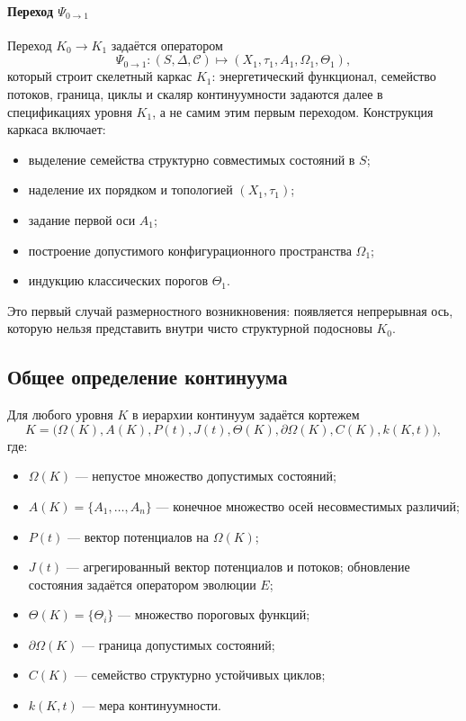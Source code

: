 \paragraph{Переход \texorpdfstring{$\Psi_{0\to 1}$}{Psi\_0\_to\_1}}
Переход \(K_0 \to K_1\) задаётся оператором
\[
    \Psi_{0\to 1} : (S,\Delta,\mathcal{C}) \mapsto (X_1,\tau_1,A_1,\Omega_1,\Theta_1),
\]
который строит скелетный каркас \(K_1\): энергетический функционал,
семейство потоков, граница, циклы и скаляр континуумности задаются далее в
спецификациях уровня \(K_1\), а не самим этим первым переходом.
Конструкция каркаса включает:
\begin{itemize}
    \item выделение семейства структурно совместимых состояний в \(S\);
    \item наделение их порядком и топологией \((X_1,\tau_1)\);
    \item задание первой оси \(A_1\);
    \item построение допустимого конфигурационного пространства \(\Omega_1\);
    \item индукцию классических порогов \(\Theta_1\).
\end{itemize}
Это первый случай размерностного возникновения: появляется непрерывная ось, которую нельзя
представить внутри чисто структурной подосновы \(K_0\).

\subsection{Общее определение континуума}

Для любого уровня \(K\) в иерархии континуум задаётся кортежем
\[
    K = \big(\Omega(K), A(K), P(t), J(t), \Theta(K), \partial\Omega(K), C(K), k(K,t)\big),
\]
где:
\begin{itemize}
    \item \(\Omega(K)\) — непустое множество допустимых состояний;
    \item \(A(K) = \{A_1,\dots,A_n\}\) — конечное множество осей несовместимых различий;
    \item \(P(t)\) — вектор потенциалов на \(\Omega(K)\);
    \item \(J(t)\) — агрегированный вектор потенциалов и потоков; обновление состояния
          задаётся оператором эволюции \(E\);
    \item \(\Theta(K) = \{\Theta_i\}\) — множество пороговых функций;
    \item \(\partial\Omega(K)\) — граница допустимых состояний;
    \item \(C(K)\) — семейство структурно устойчивых циклов;
    \item \(k(K,t)\) — мера континуумности.
\end{itemize}

